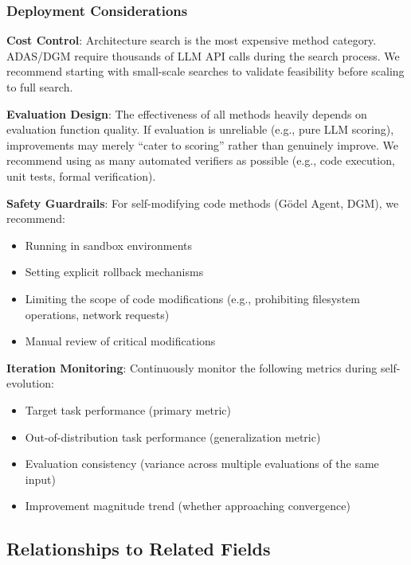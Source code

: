 \subsubsection{Deployment Considerations}

\textbf{Cost Control}: Architecture search is the most expensive method category. ADAS/DGM require thousands of LLM API calls during the search process. We recommend starting with small-scale searches to validate feasibility before scaling to full search.

\textbf{Evaluation Design}: The effectiveness of all methods heavily depends on evaluation function quality. If evaluation is unreliable (e.g., pure LLM scoring), improvements may merely ``cater to scoring'' rather than genuinely improve. We recommend using as many automated verifiers as possible (e.g., code execution, unit tests, formal verification).

\textbf{Safety Guardrails}: For self-modifying code methods (G\"{o}del Agent, DGM), we recommend:
\begin{itemize}
\item Running in sandbox environments
\item Setting explicit rollback mechanisms
\item Limiting the scope of code modifications (e.g., prohibiting filesystem operations, network requests)
\item Manual review of critical modifications
\end{itemize}

\textbf{Iteration Monitoring}: Continuously monitor the following metrics during self-evolution:
\begin{itemize}
\item Target task performance (primary metric)
\item Out-of-distribution task performance (generalization metric)
\item Evaluation consistency (variance across multiple evaluations of the same input)
\item Improvement magnitude trend (whether approaching convergence)
\end{itemize}

\subsection{Relationships to Related Fields}\label{sec:ch3-related}


